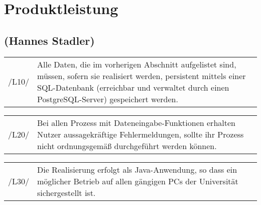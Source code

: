 \section{Produktleistung}
\label{sec:Produktleistung}
\subsection*{(Hannes Stadler)}

\begin{tabular}{p{1.5cm}p{14.5cm}}


	 /L10/	& Alle Daten, die im vorherigen Abschnitt aufgelistet sind, müssen, sofern sie realisiert werden, persistent mittels einer SQL-Datenbank (erreichbar und verwaltet durch einen PostgreSQL-Server) gespeichert werden. \\[0.25cm]
	 
\end{tabular}


\begin{tabular}{p{1.5cm}p{14.5cm}}
						
	 /L20/	& Bei allen Prozess mit Dateneingabe-Funktionen erhalten Nutzer aussagekräftige Fehlermeldungen, sollte ihr Prozess nicht ordnungsgemäß durchgeführt werden können. \\[0.25cm]
	 
\end{tabular}


\begin{tabular}{p{1.5cm}p{14.5cm}}
						
	 /L30/	& Die Realisierung erfolgt als Java-Anwendung, so dass ein möglicher Betrieb auf allen gängigen PCs der Universität sichergestellt ist. \\[0.25cm]

\end{tabular}


